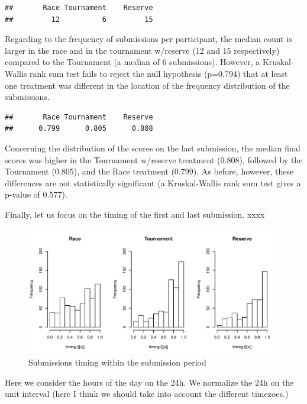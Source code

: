 \documentclass[12pt,]{article}
\begin{document}
\begin{verbatim}
##       Race Tournament    Reserve 
##         12          6         15
\end{verbatim}

Regarding to the frequency of submissions per participant, the median
count is larger in the race and in the tournament w/reserve (12 and 15
respectively) compared to the Tournament (a median of 6 submissions).
However, a Kruskal-Wallis rank sum test fails to reject the null
hypothesis (p=0.794) that at least one treatment was different in the
location of the frequency distribution of the submissions.

\begin{verbatim}
##       Race Tournament    Reserve 
##      0.799      0.805      0.808
\end{verbatim}

Concerning the distribution of the scores on the last submission, the
median final scores was higher in the Tournament w/reserve treatment
(0.808), followed by the Tournament (0.805), and the Race treatment
(0.799). As before, however, these differences are not statistically
significant (a Kruskal-Wallis rank sum test gives a p-value of 0.577).

Finally, let us focus on the timing of the first and last submission.
xxxx

\begin{figure}
\centering
\includegraphics{Figures/unnamed-chunk-17-1.pdf}
\caption{Submissions timing within the submission period}
\end{figure}

Here we consider the hours of the day on the 24h. We normalize the 24h
on the unit interval (here I think we should take into account the
different timezoes.)
\end{document}
